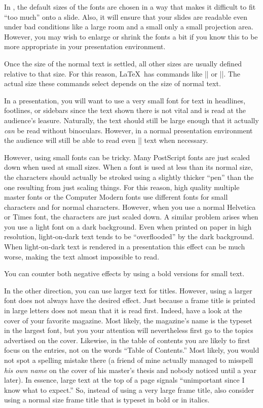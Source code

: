 In \beamer, the default sizes of the fonts are chosen in a way that
makes it difficult to fit ``too much'' onto a slide. Also, it will
ensure that your slides are readable even under bad conditions like a
large room and a small only a small projection area. However, you may
wish to enlarge or shrink the fonts a bit if you know this to be more
appropriate in your presentation environment.

Once the size of the normal text is settled, all other sizes are
usually defined relative to that size. For this reason, \LaTeX\ has 
commands like |\large| or |\small|. The actual size these commands
select depends on the size of normal text.

In a presentation, you will want to use a very small font for text in
headlines, footlines, or sidebars since the text shown there is not
vital and is read at the audience's leasure. Naturally, the text should
still be large enough that it actually \emph{can} be read without
binoculars. However, in a normal presentation environment the audience
will still be able to read even |\tiny| text when necessary.

However, using small fonts can be tricky. Many PostScript fonts are
just scaled down when used at small sizes. When a font is
used at less than its normal size, the characters should actually be
stroked using a slightly thicker ``pen'' than the one resulting from
just scaling things. For this reason, high quality 
multiple master fonts or the Computer Modern fonts use different
fonts for small characters and for normal characters. However, when
you use a normal Helvetica or Times font, the characters are just
scaled down. A similar problem arises when you use a light font on a
dark background. Even when printed on paper in high resolution,
light-on-dark text tends to be ``overflooded'' by the dark
background. When light-on-dark text is rendered in a presentation this
effect can be much worse, making the text almost impossible to read.

You can counter both negative effects by using a bold versions for
small text.

In the other direction, you can use larger text for titles. However,
using a larger font does not always have the desired effect. Just
because a frame title is printed in large letters does not
mean that it is read first. Indeed, have a look at the cover of your
favorite magazine. Most likely, the magazine's name is the typeset in the
largest font, but you your attention will nevertheless first go to the
topics advertised on the cover. Likewise, in the table of contents you
are likely to first focus on the entries, not on the words ``Table of
Contents.'' Most likely, you would not spot a spelling mistake there
(a friend of mine actually managed to misspell \emph{his own name} on
the cover of his master's thesis and nobody noticed until a year
later). In essence, large text at the top of a page signals
``unimportant since I know what to expect.'' So, instead of using a
very large frame title, also consider using a normal size frame title
that is typeset in bold or in italics. 





